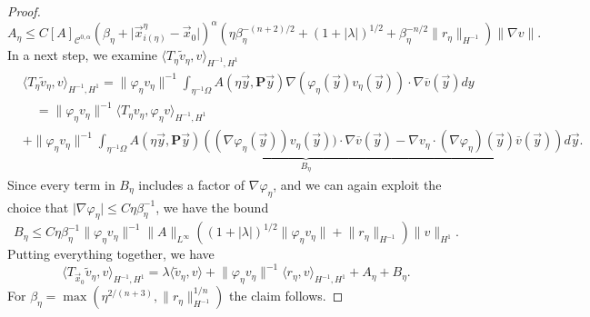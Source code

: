 \documentclass[10pt,a4paper]{amsart}
\renewcommand{\tilde}{\widetilde}
\begin{document}
\begin{proof}
    \begin{equation}
        A_\eta \leq C[A]_{\mathcal{C}^{0,\alpha}}(\beta_\eta + \lvert \vec{x}_{i(\eta)}^\eta-\vec{x}_0\rvert)^\alpha(\eta\beta_\eta^{-(n+2)/2} + (1 + \lvert \lambda\rvert)^{1/2}+ \beta_\eta^{-n/2}\lVert r_\eta\rVert_{H^{-1}})\lVert\nabla  v\rVert.
    \end{equation}
    In a next step, we examine $\langle T_{\eta}\tilde{v}_\eta,v \rangle_{H^{-1},H^{1}}$
    \begin{equation}
        \begin{aligned}
            &\langle T_{\eta}\tilde{v}_\eta,v \rangle_{H^{-1},H^{1}}=\lVert \varphi_\eta v_\eta\rVert^{-1}\int_{\eta^{-1}\Omega}A\left( \eta\vec{y}, \textbf{P}\vec{y}\right)\nabla  (\varphi_\eta(\vec{y})v_\eta(\vec{y})) \cdot \nabla \overline{v}(\vec{y})dy\\
            &\quad =\lVert \varphi_\eta v_\eta\rVert^{-1}\langle T_{\eta}v_\eta,
            \varphi_\eta v \rangle_{H^{-1},H^{1}}\\
            & + \underbrace{\lVert \varphi_\eta v_\eta\rVert^{-1}\int_{\eta^{-1}\Omega}A\left( \eta\vec{y}, \textbf{P}\vec{y}\right) \left((\nabla  \varphi_\eta(\vec{y}))v_\eta(\vec{y})) \cdot \nabla \overline{v}(\vec{y}) - \nabla v_\eta \cdot (\nabla \varphi_\eta)(\vec{y})\overline{v}(\vec{y})\right)d\vec{y}}_{B_\eta}.
        \end{aligned}
    \end{equation}
    Since every term in $B_\eta$ includes a factor of $\nabla \varphi_\eta$, and we can again exploit the choice that $\lvert \nabla \varphi_\eta\rvert \leq C\eta\beta_\eta^{-1}$, we have the bound
    \begin{equation}
        B_\eta\leq  C\eta\beta_\eta^{-1}\lVert \varphi_\eta v_\eta\rVert^{-1} \lVert A\rVert_{L^\infty}((1+\lvert \lambda \rvert)^{1/2}\lVert \varphi_\eta v_\eta\rVert + \lVert r_\eta\rVert_{H^{-1}})\lVert v\rVert_{H^1}.
    \end{equation}
    Putting everything together, we have
    \begin{equation}
        \langle T_{\vec{x}_0}\tilde{v}_\eta,v \rangle_{H^{-1},H^{1}} = \lambda \langle \tilde{v}_\eta,v \rangle + \lVert \varphi_\eta v_\eta\rVert^{-1}\langle r_\eta,v\rangle_{H^{-1},H^1}+ A_\eta + B_\eta.
    \end{equation}
    For $\beta_\eta = \max(\eta^{2/(n+3)}, \lVert r_\eta\rVert_{H^{-1}}^{1/n})$ the claim follows.
\end{proof}
\end{document}
